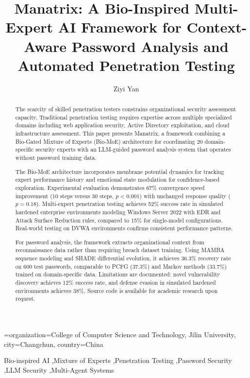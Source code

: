 \documentclass[preprint,12pt]{elsarticle}
\begin{document}
\begin{frontmatter}

\title{Manatrix: A Bio-Inspired Multi-Expert AI Framework for Context-Aware Password Analysis and Automated Penetration Testing}

\author[inst1]{Ziyi Yan}


\affiliation[inst1]={organization={College of Computer Science and Technology, Jilin University}, city={Changchun}, country={China}}

\begin{abstract}
The scarcity of skilled penetration testers constrains organizational security assessment capacity. Traditional penetration testing requires expertise across multiple specialized domains including web application security, Active Directory exploitation, and cloud infrastructure assessment. This paper presents Manatrix, a framework combining a Bio-Gated Mixture of Experts (Bio-MoE) architecture for coordinating 20 domain-specific security experts with an LLM-guided password analysis system that operates without password training data.

The Bio-MoE architecture incorporates membrane potential dynamics for tracking expert performance history and emotional state modulation for confidence-based exploration. Experimental evaluation demonstrates 67\% convergence speed improvement (10 steps versus 30 steps, $p<0.001$) with unchanged response quality ($p=0.18$). Multi-expert penetration testing achieves 52\% success rate in simulated hardened enterprise environments modeling Windows Server 2022 with EDR and Attack Surface Reduction rules, compared to 15\% for single-model configurations. Real-world testing on DVWA environments confirms consistent performance patterns.

For password analysis, the framework extracts organizational context from reconnaissance data rather than requiring breach dataset training. Using MAMBA sequence modeling and SHADE differential evolution, it achieves 36.3\% recovery rate on 600 test passwords, comparable to PCFG (37.3\%) and Markov methods (33.7\%) trained on domain-specific data. Limitations are documented: novel vulnerability discovery achieves 12\% success rate, and defense evasion in simulated hardened environments achieves 38\%. Source code is available for academic research upon request.
\end{abstract}

\begin{keyword}
Bio-inspired AI \sep Mixture of Experts \sep Penetration Testing \sep Password Security \sep LLM Security \sep Multi-Agent Systems
\end{keyword}

\end{frontmatter}
\end{document}
